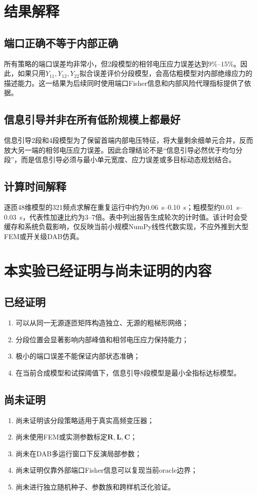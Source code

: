 \documentclass[UTF8,12pt,a4paper]{ctexart}
\begin{document}
\section{结果解释}
\subsection{端口正确不等于内部正确}
所有策略的端口误差均非常小，但2段模型的相邻电压应力误差达到$9\%$--$15\%$。因此，如果只用$Y_{11},Y_{12},Y_{22}$拟合误差评价分段模型，会高估粗模型对内部绝缘应力的描述能力。这一结果为后续同时使用端口Fisher信息和内部风险代理指标提供了依据。

\subsection{信息引导并非在所有低阶规模上都最好}
信息引导2段和4段模型为了保留首端内部电压特征，将大量剩余细单元合并，反而放大另一端的相邻电压应力误差。因此合理结论不是“信息引导必然优于均匀分段”，而是信息引导必须与最小单元宽度、应力误差或多目标动态规划结合。

\subsection{计算时间解释}
逐匝48维模型的321频点求解在重复运行中约为\SI{0.06}{s}--\SI{0.10}{s}；粗模型约\SI{0.01}{s}--\SI{0.03}{s}，代表性加速比约为3--7倍。表中列出报告生成轮次的计时值。该计时会受缓存和系统负载影响，仅反映当前小规模NumPy线性代数实现，不应外推到大型FEM或开关级DAB仿真。

\section{本实验已经证明与尚未证明的内容}
\subsection*{已经证明}
\begin{enumerate}
\item 可以从同一无源逐匝矩阵构造独立、无源的粗梯形网络；
\item 分段位置会显著影响内部峰值和相邻电压应力保持能力；
\item 极小的端口误差不能保证内部状态准确；
\item 在当前合成模型和试探阈值下，信息引导8段模型是最小全指标达标模型。
\end{enumerate}

\subsection*{尚未证明}
\begin{enumerate}
\item 尚未证明该分段策略适用于真实高频变压器；
\item 尚未使用FEM或实测参数标定$\bm R,\bm L,\bm C$；
\item 尚未在DAB多运行窗口下反演局部参数；
\item 尚未证明仅靠外部端口Fisher信息可以复现当前oracle边界；
\item 尚未进行独立随机种子、参数族和跨样机泛化验证。
\end{enumerate}
\end{document}
